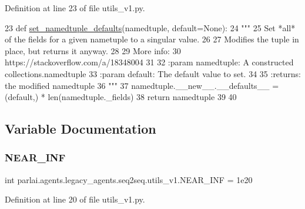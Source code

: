 Definition at line 23 of file utils\+\_\+v1.\+py.


\begin{DoxyCode}
23 \textcolor{keyword}{def }\hyperlink{namespaceparlai_1_1agents_1_1legacy__agents_1_1seq2seq_1_1utils__v1_a17553492abb2e671bc3fc58e1e3a96b0}{set\_namedtuple\_defaults}(namedtuple, default=None):
24     \textcolor{stringliteral}{"""}
25 \textcolor{stringliteral}{    Set *all* of the fields for a given nametuple to a singular value.}
26 \textcolor{stringliteral}{}
27 \textcolor{stringliteral}{    Modifies the tuple in place, but returns it anyway.}
28 \textcolor{stringliteral}{}
29 \textcolor{stringliteral}{    More info:}
30 \textcolor{stringliteral}{    https://stackoverflow.com/a/18348004}
31 \textcolor{stringliteral}{}
32 \textcolor{stringliteral}{    :param namedtuple: A constructed collections.namedtuple}
33 \textcolor{stringliteral}{    :param default: The default value to set.}
34 \textcolor{stringliteral}{}
35 \textcolor{stringliteral}{    :returns: the modified namedtuple}
36 \textcolor{stringliteral}{    """}
37     namedtuple.\_\_new\_\_.\_\_defaults\_\_ = (default,) * len(namedtuple.\_fields)
38     \textcolor{keywordflow}{return} namedtuple
39 
40 
\end{DoxyCode}


\subsection{Variable Documentation}
\mbox{\label{namespaceparlai_1_1agents_1_1legacy__agents_1_1seq2seq_1_1utils__v1_ab1b867624df2a08ba94de6bd5a7acca4}} 
\subsubsection{\texorpdfstring{N\+E\+A\+R\+\_\+\+I\+NF}{NEAR\_INF}}
{\footnotesize\ttfamily int parlai.\+agents.\+legacy\+\_\+agents.\+seq2seq.\+utils\+\_\+v1.\+N\+E\+A\+R\+\_\+\+I\+NF = 1e20}



Definition at line 20 of file utils\+\_\+v1.\+py.

